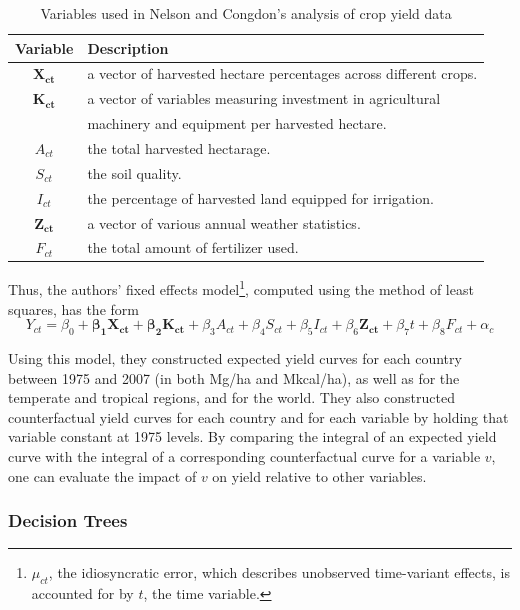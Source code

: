 \documentclass[12pt,twoside]{article}
\begin{document}
\begin{table}
\begin{tabularx}{\textwidth}{cl}
\toprule
Variable & Description \\
\midrule
$\pmb{X_{ct}}$ & a vector of harvested hectare percentages across different crops. \\
$\pmb{K_{ct}}$ & a vector of variables measuring investment in agricultural \\
& machinery and equipment per harvested hectare. \\
$A_{ct}$ & the total harvested hectarage. \\
$S_{ct}$ & the soil quality. \\
$I_{ct}$ & the percentage of harvested land equipped for irrigation. \\
$\pmb{Z_{ct}}$ & a vector of various annual weather statistics. \\
$F_{ct}$ & the total amount of fertilizer used. \\
\bottomrule
\end{tabularx}
\caption[Variables for Fixed-Effects Regression Analysis]{Variables used in Nelson and Congdon's analysis of crop yield data \cite{nelson_measuring_2016}}
\label{vars}
\end{table}

Thus, the authors' fixed effects model\footnote{$\mu_{ct}$, the idiosyncratic error, which describes unobserved time-variant effects, is accounted for by $t$, the time variable.}, computed using the method of least squares, has the form
$$Y_{ct} = \beta_0 + \pmb{\beta_1}\pmb{X_{ct}} + \pmb{\beta_2}\pmb{K_{ct}} + \beta_3A_{ct} + \beta_4S_{ct} + \beta_5I_{ct} + \beta_6\pmb{Z_{ct}} + \beta_7t + \beta_8F_{ct} + \alpha_c$$

Using this model, they constructed expected yield curves for each country between 1975 and 2007 (in both Mg/ha and Mkcal/ha), as well as for the temperate and tropical regions, and for the world. They also constructed counterfactual yield curves for each country and for each variable by holding that variable constant at 1975 levels. By comparing the integral of an expected yield curve with the integral of a corresponding counterfactual curve for a variable $v$, one can evaluate the impact of $v$ on yield relative to other variables.

\subsubsection{Decision Trees}
\end{document}
